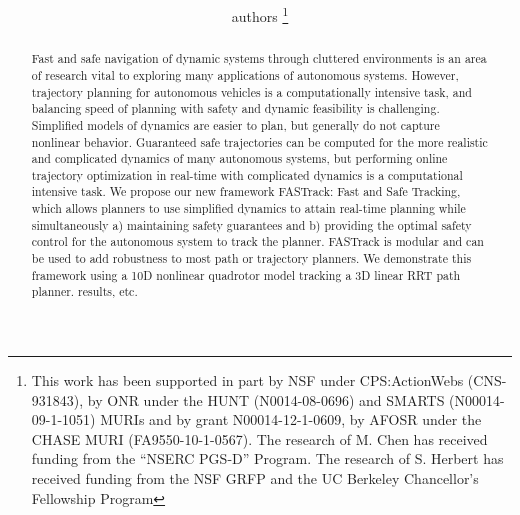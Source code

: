 \documentclass[letterpaper, 10pt, conference]{ieeeconf}      %
\title{\LARGE \bf \MCnote{A Very Good Title}}
\author{authors
\thanks{\color{red}This work has been supported in part by NSF under CPS:ActionWebs (CNS-931843), by ONR under the HUNT (N0014-08-0696) and SMARTS (N00014-09-1-1051) MURIs and by grant N00014-12-1-0609, by AFOSR under the CHASE MURI (FA9550-10-1-0567). The research of M. Chen has received funding from the ``NSERC PGS-D'' Program. The research of S. Herbert has received funding from the NSF GRFP and the UC Berkeley Chancellor's Fellowship Program}
}
\begin{document}
\maketitle
\thispagestyle{empty}
\pagestyle{empty}

\begin{abstract}

Fast and safe navigation of dynamic systems through cluttered environments is an area of research vital to exploring many applications of autonomous systems. However, trajectory planning for autonomous vehicles is a computationally intensive task, and balancing speed of planning with safety and dynamic feasibility is challenging. Simplified models of dynamics are easier to plan, but generally do not capture nonlinear behavior. Guaranteed safe trajectories can be computed for the more realistic and complicated dynamics of many autonomous systems, but performing online trajectory optimization in real-time with complicated dynamics is a computational intensive task. We propose our new framework FASTrack: Fast and Safe Tracking, which allows planners to use simplified dynamics to attain real-time planning while simultaneously a) maintaining safety guarantees and b) providing the optimal safety control for the autonomous system to track the planner. FASTrack is modular and can be used to add robustness to most path or trajectory planners.
 We demonstrate this framework using a 10D nonlinear quadrotor model tracking a 3D linear RRT path planner. \color{red} results, etc.
\end{abstract}
\end{document}
